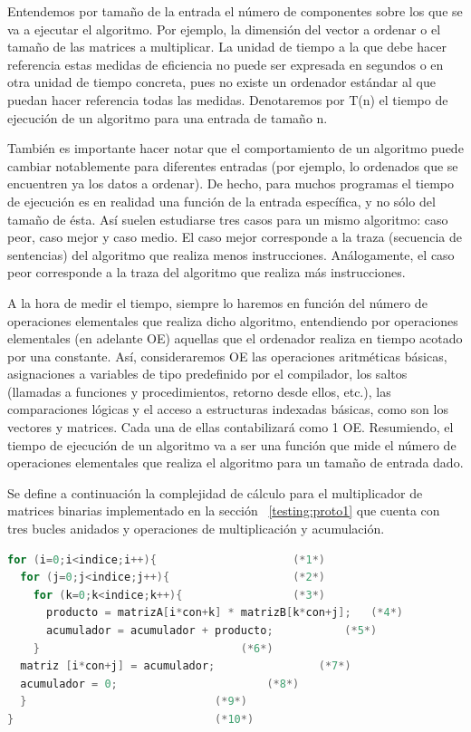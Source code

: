 		Entendemos por tamaño de la entrada el número de componentes sobre los que  se va a ejecutar el algoritmo. Por ejemplo, la dimensión del vector a
		ordenar o el tamaño de las matrices a multiplicar. La unidad de tiempo a la que debe hacer referencia estas medidas de eficiencia  no puede ser
		expresada en segundos o en otra unidad de tiempo concreta, pues no existe un ordenador estándar al que puedan hacer referencia todas las medidas. 
        Denotaremos por T(n) el tiempo de ejecución de un algoritmo para una entrada de tamaño n. 
        
        También es importante hacer notar que el comportamiento de un algoritmo puede cambiar notablemente para diferentes entradas (por ejemplo, lo
        ordenados que se encuentren ya los datos a ordenar). De hecho, para muchos programas el tiempo de ejecución es en realidad una función de la
        entrada específica, y no sólo del tamaño de ésta. Así suelen estudiarse tres casos para un mismo algoritmo: caso peor, caso mejor y caso
        medio. El caso mejor corresponde a la traza (secuencia de sentencias) del algoritmo que realiza menos instrucciones. Análogamente, el caso
        peor corresponde a la traza del algoritmo que realiza más instrucciones.
 		
 		A la hora de medir el tiempo, siempre lo haremos en función del número de operaciones elementales que realiza dicho algoritmo, entendiendo por
 		operaciones elementales (en adelante OE) aquellas que el ordenador realiza en tiempo acotado por una constante. Así, consideraremos OE las
 		operaciones aritméticas básicas,  asignaciones a variables de tipo predefinido por el compilador, los saltos (llamadas a funciones y
 		procedimientos, retorno desde ellos, etc.), las comparaciones lógicas y el acceso a estructuras indexadas básicas, como son los vectores y
 		matrices. Cada una de ellas contabilizará como 1 OE. Resumiendo, el tiempo de ejecución de un algoritmo va a ser una función que mide el número de
 		operaciones elementales que realiza el algoritmo para un tamaño de entrada dado.
		
		Se define a continuación la complejidad de cálculo para el multiplicador de matrices binarias implementado en la sección ~\ref {testing:proto1} que
		cuenta con tres bucles anidados y operaciones de multiplicación y acumulación.
	
\newpage			
	\begin{lstlisting}[language=C,frame=single , caption={Código del programa de prueba multiplicador de matrices binarias}]
for (i=0;i<indice;i++){						(*1*)
  for (j=0;j<indice;j++){					(*2*)
    for (k=0;k<indice;k++){					(*3*)
	  producto = matrizA[i*con+k] * matrizB[k*con+j];	(*4*)
	  acumulador = acumulador + producto;			(*5*) 
    }								(*6*)
  matriz [i*con+j] = acumulador;				(*7*)
  acumulador = 0;						(*8*)
  }								(*9*)
}								(*10*)
	\end{lstlisting}
		
